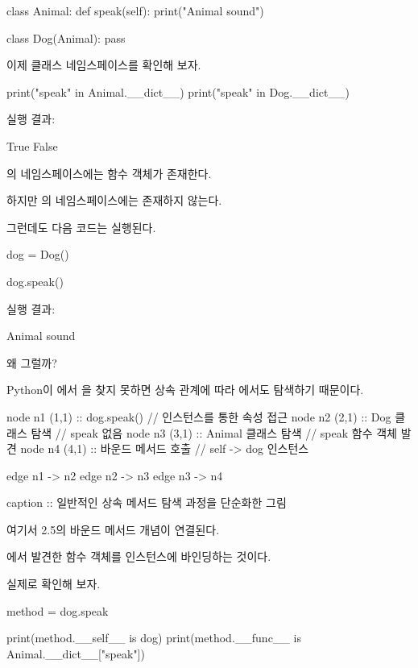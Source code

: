 \begin{dhkcode}
class Animal:
    def speak(self):
        print("Animal sound")


class Dog(Animal):
    pass
\end{dhkcode}

이제 클래스 네임스페이스를 확인해 보자.

\begin{dhkcode}
print("speak" in Animal.__dict__)
print("speak" in Dog.__dict__)
\end{dhkcode}

실행 결과:

\begin{dhkzsh}
True
False
\end{dhkzsh}

의 네임스페이스에는  함수 객체가 존재한다.

하지만 의 네임스페이스에는 존재하지 않는다.

그런데도 다음 코드는 실행된다.

\begin{dhkcode}
dog = Dog()

dog.speak()
\end{dhkcode}

실행 결과:

\begin{dhkzsh}
Animal sound
\end{dhkzsh}

왜 그럴까?

Python이 에서 을 찾지 못하면 상속 관계에 따라 에서도 탐색하기 때문이다.

\begin{dhkgraph}[uniform]
node n1 (1,1) :: dog.speak() // 인스턴스를 통한 속성 접근
node n2 (2,1) :: Dog 클래스 탐색 // speak 없음
node n3 (3,1) :: Animal 클래스 탐색 // speak 함수 객체 발견
node n4 (4,1) :: 바운드 메서드 호출 // self -> dog 인스턴스

edge n1 -> n2
edge n2 -> n3
edge n3 -> n4

caption :: 일반적인 상속 메서드 탐색 과정을 단순화한 그림
\end{dhkgraph}

여기서 2.5의 바운드 메서드 개념이 연결된다.

에서 발견한 함수 객체를  인스턴스에 바인딩하는 것이다.

실제로 확인해 보자.

\begin{dhkcode}
method = dog.speak

print(method.__self__ is dog)
print(method.__func__ is Animal.__dict__["speak"])
\end{dhkcode}

